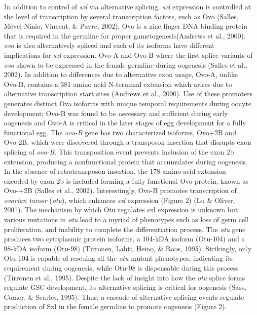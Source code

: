 \documentclass[12pt,twoside]{reedthesis}
\begin{document}
In addition to control of \emph{sxl} via alternative splicing, \emph{sxl}
expression is controlled at the level of transcription by several
transcription factors, such as Ovo (Salles, Mével-Ninio, Vincent, \& Payre, 2002). Ovo is a zinc
finger DNA binding protein that is required in the germline for proper
gametogenesis(Andrews et al., 2000). \emph{ovo} is also alternatively spliced and
each of its isoforms have different implications for \emph{sxl} expression.
Ovo-A and Ovo-B where the first splice variants of \emph{ovo} shown to be
expressed in the female germline during oogenesis (Salles et al., 2002). In
addition to differences due to alternative exon usage, Ovo-A, unlike
Ovo-B, contains a 381 amino acid N-terminal extension which arises due
to alternative transcription start sites (Andrews et al., 2000). Use of
these promoters generates distinct Ova isoforms with unique temporal
requirements during oocyte development; Ovo-B was found to be necessary
and sufficient during early oogenesis and Ovo-A is critical in the later
stages of egg development for a fully functional egg. The \emph{ovo-B} gene
has two characterized isoforms, Ovo+2B and Ovo-2B, which were discovered
through a transposon insertion that disrupts exon splicing of \emph{ovo-B}.
This transposition event prevents inclusion of the exon 2b extension,
producing a nonfunctional protein that accumulates during oogenesis. In
the absence of retrotransposon insertion, the 178-amino acid extension
encoded by exon 2b is included forming a fully functional Ovo protein,
known as Ovo-+2B (Salles et al., 2002). Interestingly, Ovo-B promotes
transcription of \emph{ovarian tumor} (\emph{otu}), which enhances \emph{sxl}
expression (Figure 2) (Lu \& Oliver, 2001). The mechanism by which Otu regulates
sxl expression is unknown but various mutations in \emph{otu} lead to a
myriad of phenotypes such as loss of germ cell proliferation, and
inability to complete the differentiation process. The \emph{otu} gene
produces two cytoplasmic protein isoforms, a 104-kDA isoform (Otu-104)
and a 98-kDA isoform (Otu-98) (Tirronen, Lahti, Heino, \& Roos, 1995). Strikingly, only
Otu-104 is capable of rescuing all the \emph{otu} mutant phenotypes,
indicating its requirement during oogenesis, while Otu-98 is dispensable
during this process (Tirronen et al., 1995). Despite the lack of insight into
how the \emph{otu} splice forms regulate GSC development, its alternative
splicing is critical for oogenesis (Sass, Comer, \& Searles, 1995). Thus, a cascade of
alternative splicing events regulate production of Sxl in the female
germline to promote oogenesis (Figure 2).
\end{document}

